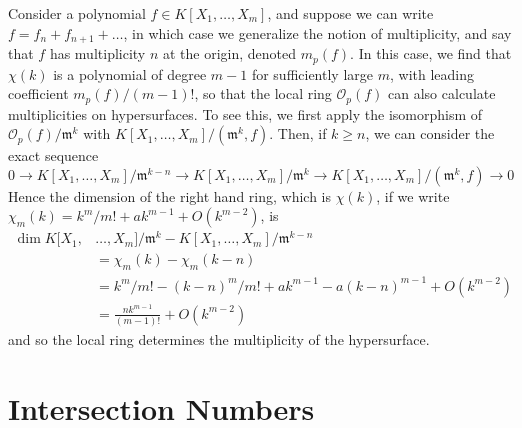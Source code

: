 \begin{example}
    Consider a polynomial $f \in K[X_1, \dots, X_m]$, and suppose we can write $f = f_n + f_{n+1} + \dots$, in which case we generalize the notion of multiplicity, and say that $f$ has multiplicity $n$ at the origin, denoted $m_p(f)$. In this case, we find that $\chi(k)$ is a polynomial of degree $m-1$ for sufficiently large $m$, with leading coefficient $m_p(f)/(m-1)!$, so that the local ring $\mathcal{O}_p(f)$ can also calculate multiplicities on hypersurfaces. To see this, we first apply the isomorphism of $\mathcal{O}_p(f)/\mathfrak{m}^k$ with $K[X_1, \dots, X_m]/(\mathfrak{m}^k,f)$. Then, if $k \geq n$, we can consider the exact sequence
    \[ 0 \to K[X_1, \dots, X_m]/\mathfrak{m}^{k-n} \to K[X_1, \dots, X_m]/\mathfrak{m}^k \to K[X_1, \dots, X_m]/(\mathfrak{m}^k, f) \to 0 \]
    Hence the dimension of the right hand ring, which is $\chi(k)$, if we write $\chi_m(k) = k^m/m! + ak^{m-1} + O(k^{m-2})$, is
    \begin{align*}
        \dim K[X_1,& \dots, X_m]/\mathfrak{m}^k - K[X_1, \dots, X_m]/\mathfrak{m}^{k-n}\\
        &= \chi_m(k) - \chi_m(k-n)\\
        &= k^m/m! - (k-n)^m/m! + ak^{m-1} - a(k-n)^{m-1} + O(k^{m-2})\\
        &= \frac{nk^{m-1}}{(m-1)!} + O(k^{m-2})
    \end{align*}
    and so the local ring determines the multiplicity of the hypersurface.
\end{example}

\section{Intersection Numbers}


